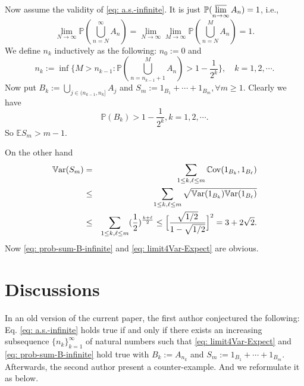 \documentclass{article}
\numberwithin{equation}{section}
\newcommand{\Cov}{{\mathbb{C}}{\rm ov}}
\newcommand{\Var}{{\mathbb{V}}{\rm ar}}
\newcommand{\Enum}{\mathbb{E}}
\newcommand{\Pnum}{\mathbb{P}}
\begin{document}
Now assume the validity of \eqref{eq: a.s.-infinite}. It is just $\displaystyle \Pnum (\varlimsup_{n \to \infty} A_n)=1$, i.e.,
$$
\lim_{N \to \infty} \Pnum (\bigcup_{n=N}^\infty A_n)=\lim_{N \to \infty} \lim_{M \to \infty}\Pnum (\bigcup_{n=N}^M A_n)=1.
$$
We define $n_k$ inductively as the following: $n_0:=0$ and
$$
n_{k}:=\inf\{M > n_{k-1}: \Pnum (\bigcup_{n=n_{k-1}+1}^M A_n)>1-\frac{1}{2^{k}}\}, \quad k=1, 2, \cdots.
$$
Now put $\displaystyle B_k:=\bigcup_{j \in (n_{k-1}, n_k]} A_j$ and $S_m:=1_{B_1}+\cdots+1_{B_m}, \forall m \geq 1$. Clearly we have
$$
\Pnum (B_k)>1-\frac{1}{2^k}, k=1,2, \cdots.
$$
So $\Enum S_m >m -1$.


On the other hand
\begin{eqnarray*}
\Var (S_m) &=& \sum_{1 \leq k, \ell \leq m} \Cov (1_{B_k}, 1_{B_\ell}) \\
&\leq& \sum_{1 \leq k, \ell \leq m} \sqrt{\Var(1_{B_k}) \Var(1_{B_\ell})} \\
&\leq&  \sum_{1 \leq k, \ell \leq m} (\frac{1}{2})^{\frac{k+\ell}{2}} \leq \Bigl[\frac{\sqrt{1/2}}{1-\sqrt{1/2}}\Bigr]^2=3+2 \sqrt{2}.
\end{eqnarray*}
Now \eqref{eq: prob-sum-B-infinite} and \eqref{eq: limit4Var-Expect} are obvious.

\section{Discussions}\label{sec: C3}
In an old version of the current paper, the first author conjectured the following: Eq. \eqref{eq: a.s.-infinite} holds true if and only if there exists an increasing subsequence $\{n_k\}_{k=1}^\infty$ of
natural numbers such that \eqref{eq: limit4Var-Expect} and \eqref{eq: prob-sum-B-infinite} hold true with $B_k:=A_{n_k}$ and $S_m :=1_{B_1} +\cdots +1_{B_m}$. Afterwards, the second author present a
counter-example. And we reformulate it as below.
\end{document}

